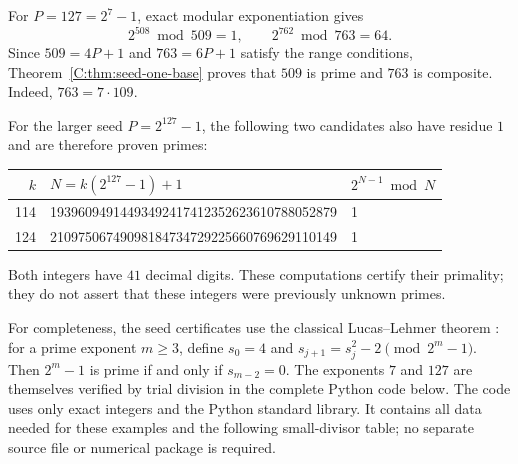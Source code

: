 \documentclass[11pt,a4paper]{article}
\theoremstyle{definition}
\theoremstyle{remark}
\numberwithin{equation}{section}
\begin{document}
For $P=127=2^7-1$, exact modular exponentiation gives
\[
  2^{508}\bmod509=1,\qquad
  2^{762}\bmod763=64.
\]
Since $509=4P+1$ and $763=6P+1$ satisfy the range conditions,
Theorem~\ref{C:thm:seed-one-base} proves that $509$ is prime and $763$
is composite. Indeed, $763=7\cdot109$.

For the larger seed $P=2^{127}-1$, the following two candidates also
have residue $1$ and are therefore proven primes:
\begin{center}
\small
\begin{tabular}{@{}rll@{}}
\toprule
$k$ & $N=k(2^{127}-1)+1$ & $2^{N-1}\bmod N$\\
\midrule
114 & 19396094914493492417412352623610788052879 & 1\\
124 & 21097506749098184734729225660769629110149 & 1\\
\bottomrule
\end{tabular}
\end{center}
Both integers have $41$ decimal digits. These computations certify
their primality; they do not assert that these integers were previously
unknown primes.

For completeness, the seed certificates use the classical
Lucas--Lehmer theorem \cite{R079}: for a prime exponent $m\ge3$, define
$s_0=4$ and $s_{j+1}=s_j^2-2\pmod{2^m-1}$. Then $2^m-1$ is prime
if and only if $s_{m-2}=0$. The exponents $7$ and $127$ are themselves
verified by trial division in the complete Python code below. The
code uses only exact integers and the Python standard library. It
contains all data needed for these examples and the following
small-divisor table; no separate source file or numerical package is
required.
\end{document}
